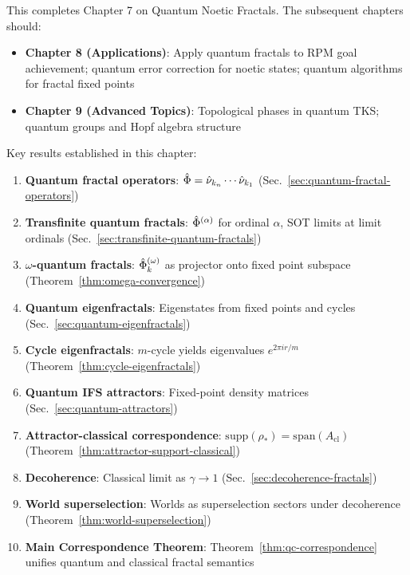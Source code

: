 \begin{tcolorbox}[colback=green!5!white,colframe=green!50!black,title=\textbf{Handoff: Next Steps},breakable]
This completes Chapter 7 on Quantum Noetic Fractals. The subsequent chapters should:
\begin{itemize}
  \item \textbf{Chapter 8 (Applications)}: Apply quantum fractals to RPM goal achievement; quantum error correction for noetic states; quantum algorithms for fractal fixed points
  \item \textbf{Chapter 9 (Advanced Topics)}: Topological phases in quantum TKS; quantum groups and Hopf algebra structure
\end{itemize}

Key results established in this chapter:
\begin{enumerate}
  \item \textbf{Quantum fractal operators}: $\hat{\Phi} = \hat{\nu}_{k_n} \cdots \hat{\nu}_{k_1}$ (Sec.~\ref{sec:quantum-fractal-operators})
  \item \textbf{Transfinite quantum fractals}: $\hat{\Phi}^{(\alpha)}$ for ordinal $\alpha$, SOT limits at limit ordinals (Sec.~\ref{sec:transfinite-quantum-fractals})
  \item \textbf{$\omega$-quantum fractals}: $\hat{\Phi}^{(\omega)}_k$ as projector onto fixed point subspace (Theorem~\ref{thm:omega-convergence})
  \item \textbf{Quantum eigenfractals}: Eigenstates from fixed points and cycles (Sec.~\ref{sec:quantum-eigenfractals})
  \item \textbf{Cycle eigenfractals}: $m$-cycle yields eigenvalues $e^{2\pi i r/m}$ (Theorem~\ref{thm:cycle-eigenfractals})
  \item \textbf{Quantum IFS attractors}: Fixed-point density matrices (Sec.~\ref{sec:quantum-attractors})
  \item \textbf{Attractor-classical correspondence}: $\mathrm{supp}(\rho_*) = \mathrm{span}(A_{\mathrm{cl}})$ (Theorem~\ref{thm:attractor-support-classical})
  \item \textbf{Decoherence}: Classical limit as $\gamma \to 1$ (Sec.~\ref{sec:decoherence-fractals})
  \item \textbf{World superselection}: Worlds as superselection sectors under decoherence (Theorem~\ref{thm:world-superselection})
  \item \textbf{Main Correspondence Theorem}: Theorem~\ref{thm:qc-correspondence} unifies quantum and classical fractal semantics
\end{enumerate}


\end{tcolorbox}
